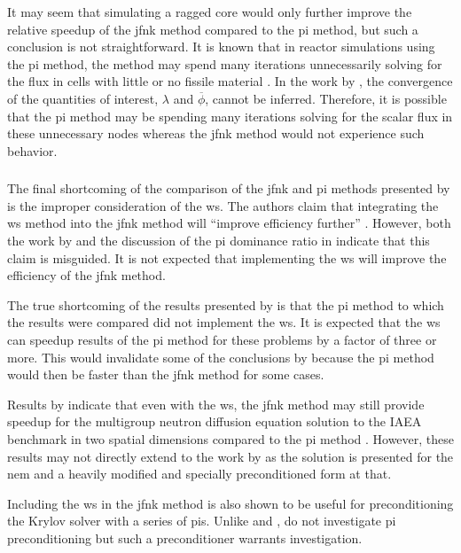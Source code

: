       It may seem that simulating a ragged core would only further improve the
      relative speedup of the \gls{jfnk} method compared to the \gls{pi} method,
      but such a conclusion is not straightforward. It is known that in reactor
      simulations using the \gls{pi} method, the method may spend many
      iterations unnecessarily solving for the flux in cells with little or no
      fissile material \cite{gehinThesis}. In the work by \citeauthor{qe2paper},
      the convergence of the quantities of interest, $\lambda$ and
      $\overline{\phi}$, cannot be inferred. Therefore, it is possible that the
      \gls{pi} method may be spending many iterations solving for the scalar
      flux in these unnecessary nodes whereas the \gls{jfnk} method would not
      experience such behavior.

    \subsubsection{}
    \label{sec:wielandt_shift}

      The final shortcoming of the comparison of the \gls{jfnk} and \gls{pi}
      methods presented by \citeauthor{qe2paper} is the improper consideration
      of the \gls{ws}. The authors claim that integrating the \gls{ws} method
      into the \gls{jfnk} method will ``improve efficiency further''
      \cite{qe2paper}. However, both the work by \citeauthor{gill_azmy} and the
      discussion of the \gls{pi} dominance ratio in 
      indicate that this claim is misguided. It is not expected that
      implementing the \gls{ws} will improve the efficiency of the \gls{jfnk}
      method.

      The true shortcoming of the results presented by \citeauthor{qe2paper} is
      that the \gls{pi} method to which the results were compared did not
      implement the \gls{ws}. It is expected that the \gls{ws} can speedup
      results of the \gls{pi} method for these problems by a factor of three or
      more. This would invalidate some of the conclusions by
      \citeauthor{qe2paper} because the \gls{pi} method would then be faster
      than the \gls{jfnk} method for some cases.

      Results by \citeauthor{jfnk_wielandt} indicate that even with the
      \gls{ws}, the \gls{jfnk} method may still provide speedup for the
      multigroup neutron diffusion equation solution to the IAEA benchmark in
      two spatial dimensions compared to the \gls{pi} method
      \cite{jfnk_wielandt}. However, these results may not directly extend to
      the work by \citeauthor{qe2paper} as the solution is presented for the
      \gls{nem} and a heavily modified and specially preconditioned form at
      that.

      Including the \gls{ws} in the \gls{jfnk} method is also shown to be useful
      for preconditioning the Krylov solver with a series of \glspl{pi}. Unlike
      \citeauthor{gill_azmy} and \citeauthor{jfnk_wielandt},
      \citeauthor{qe2paper} do not investigate \gls{pi} preconditioning but such
      a preconditioner warrants investigation.
